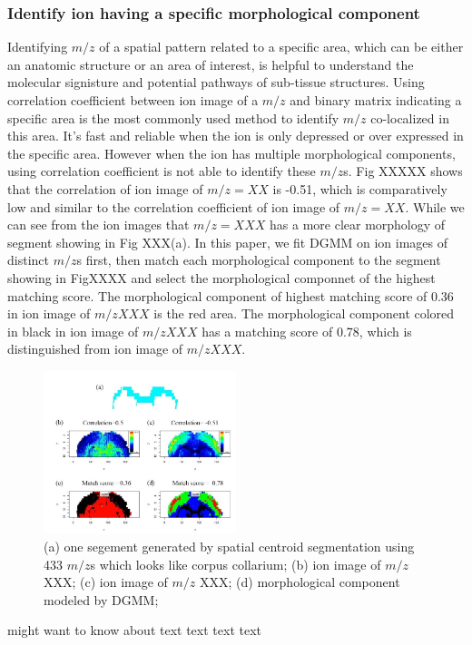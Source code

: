 \documentclass{bioinfo}
\begin{document}
\subsubsection{Identify ion having a specific morphological component}
Identifying $m/z$ of a spatial pattern related to a specific area, which can be either an anatomic structure or an area of interest, is helpful to understand the molecular signisture and potential pathways of sub-tissue structures. Using correlation coefficient between ion image of a $m/z$ and binary matrix indicating a specific area is the most commonly used method to identify $m/z$ co-localized in this area. It's fast and reliable when the ion is only depressed or over expressed in the specific area. However when the ion has multiple morphological components, using correlation coefficient is not able to identify these $m/z$s. Fig XXXXX shows that the correlation of ion image of $m/z=XX$ is -0.51, which is comparatively low and similar to the correlation coefficient of ion image of $m/z=XX$. While we can see from the ion images that $m/z=XXX$ has a more clear morphology of segment showing in Fig XXX(a). In this paper, we fit DGMM on ion images of distinct $m/z$s first, then match each morphological component to the segment showing in FigXXXX and select the morphological componnet of the highest matching score. The morphological component of highest matching score of 0.36 in ion image of $m/zXXX$ is the red area. The morphological component colored in black  in ion image of $m/zXXX$ has a matching score of 0.78, which is distinguished from ion image of $m/z XXX$.

\begin{figure}[b!]
    
	\includegraphics[width=0.5\textwidth]{figure6.jpg}
    \caption{(a) one segement generated by spatial centroid segmentation using 433 $m/z$s which looks like corpus collarium; (b) ion image of $m/z$ XXX; (c) ion image of $m/z$ XXX; (d) morphological component modeled by DGMM; }
    \label{fig:figure6}
\end{figure}
\citealp{Boffelli03} might want to know about text text text
text\vspace*{1pt}
\end{document}
